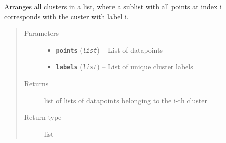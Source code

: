 \documentclass[letterpaper,10pt,english]{sphinxmanual}
\begin{document}
\begin{fulllineitems}
\label{src.clustering:src.clustering.cluster_mappings.aggregate_cluster}
Arranges all clusters in a list, where a sublist with all points at index i corresponds with the
custer with label i.
\begin{quote}\begin{description}
\item[{Parameters}] \leavevmode\begin{itemize}
\item {} 
\textbf{\texttt{points}} (\emph{\texttt{list}}) -- List of datapoints

\item {} 
\textbf{\texttt{labels}} (\emph{\texttt{list}}) -- List of unique cluster labels

\end{itemize}

\item[{Returns}] \leavevmode
list of lists of datapoints belonging to the i-th cluster

\item[{Return type}] \leavevmode
list

\end{description}\end{quote}

\end{fulllineitems}

\end{document}
